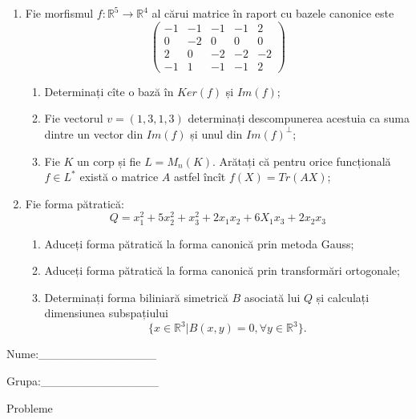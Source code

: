 \documentclass{article}
\begin{document}
\begin{enumerate}
 \item Fie morfismul $f:\mathbb{R}^5 \to \mathbb{R}^4$ al cărui matrice în raport cu bazele canonice este
$$\begin{pmatrix}
-1&-1&-1&-1&2\\
0&-2&0&0&0\\
2&0&-2&-2&-2\\
-1&1&-1&-1&2
\end{pmatrix}$$

\begin{enumerate}
\item Determinați cîte o bază în $Ker(f)$ și $Im(f)$;
\item Fie vectorul $v=(1,3,1,3)$ determinați descompunerea acestuia ca suma dintre un vector din $Im(f)$ și unul din $Im(f)^\perp$;
\item Fie $K$ un corp și fie $L=M_n(K)$. Arătați că pentru orice funcțională $f \in L^*$ există o matrice $A$ astfel încît $f(X)=Tr(AX)$;
\end{enumerate}
\item Fie forma pătratică:
$$Q= x_1^2+5x_2^2+x_3^2+2x_1x_2+6X_1x_3+2x_2x_3$$

\begin{enumerate}
\item Aduceți forma pătratică la forma canonică prin metoda Gauss;
\item Aduceți forma pătratică la forma canonică prin transformări ortogonale;
\item Determinați forma biliniară simetrică $B$ asociată lui $Q$ și calculați dimensiunea subspațiului
$$\{x \in \mathbb{R}^3 | B(x,y)=0,\forall y \in \mathbb{R}^3\}.$$

\end{enumerate}
\end{enumerate}
\newpage
\begin{flushright}
Nume:\_\_\_\_\_\_\_\_\_\_\_\_\_\_
 
 
Grupa:\_\_\_\_\_\_\_\_\_\_\_\_\_\_
\end{flushright}
\begin{center}
\vspace{2cm}
{\Large Probleme}
\vspace{2cm}
\end{center}
\end{document}
